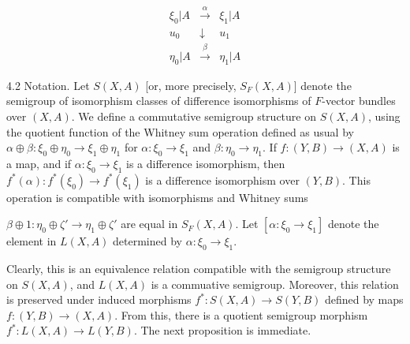 $$\begin{array}{ccc}
\xi_0|A & \xrightarrow{\alpha} & \xi_1|A \\
u_0 & \downarrow & u_1 \\
\eta_0|A & \xrightarrow{\beta} & \eta_1|A
\end{array}$$

4.2 Notation. Let $S(X, A)$ [or, more precisely, $S_F(X, A)$] denote the semigroup of isomorphism classes of difference isomorphisms of $F$-vector bundles over $(X, A)$. We define a commutative semigroup structure on $S(X, A)$, using the quotient function of the Whitney sum operation defined as usual by $\alpha \oplus \beta: \xi_0 \oplus \eta_0 \rightarrow \xi_1 \oplus \eta_1$ for $\alpha: \xi_0 \rightarrow \xi_1$ and $\beta: \eta_0 \rightarrow \eta_1$. If $f: (Y, B) \rightarrow (X, A)$ is a map, and if $\alpha: \xi_0 \rightarrow \xi_1$ is a difference isomorphism, then $f^*(\alpha): f^*(\xi_0) \rightarrow f^*(\xi_1)$ is a difference isomorphism over $(Y, B)$. This operation is compatible with isomorphisms and Whitney sums

$\beta \oplus 1: \eta_0 \oplus \zeta' \rightarrow \eta_1 \oplus \zeta'$ are equal in $S_F(X, A)$. Let $[\alpha: \xi_0 \rightarrow \xi_1]$ denote the element in $L(X, A)$ determined by $\alpha: \xi_0 \rightarrow \xi_1$.

Clearly, this is an equivalence relation compatible with the semigroup structure on $S(X, A)$, and $L(X, A)$ is a commuative semigroup. Moreover, this relation is preserved under induced morphisms $f^*: S(X, A) \rightarrow S(Y, B)$ defined by maps $f: (Y, B) \rightarrow (X, A)$. From this, there is a quotient semigroup morphism $f^*: L(X, A) \rightarrow L(Y, B)$. The next proposition is immediate.

